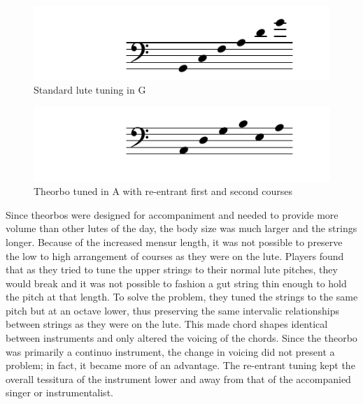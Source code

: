 \begin{figure}[h]
\centering
\includegraphics{examples/lute-tuning.pdf}
\caption{Standard lute tuning in G}
\label{g-lute}
\end{figure}
\begin{figure}[h]
\centering
\includegraphics{examples/theorbo-tuning.pdf}
\caption{Theorbo tuned in A with re-entrant first and second courses}
\label{a-theorbo}
\end{figure}

Since theorbos were designed for accompaniment and needed to provide more volume than other lutes of the day, the body
size was much larger and the strings longer. Because of the increased mensur length, it was not possible to preserve the
low to high arrangement of courses as they were on the lute. Players found that as they tried to tune the upper strings
to their normal lute pitches, they would break and it was not possible to fashion a gut string thin enough to hold the
pitch at that length. To solve the problem, they tuned the strings to the same pitch but at an octave lower, thus
preserving the same intervalic relationships between strings as they were on the lute. This made chord shapes identical
between instruments and only altered the voicing of the chords. Since the theorbo was primarily a continuo instrument,
the change in voicing did not present a problem; in fact, it became more of an advantage. The re-entrant tuning kept the
overall tessitura of the instrument lower and away from that of the accompanied singer or instrumentalist.

